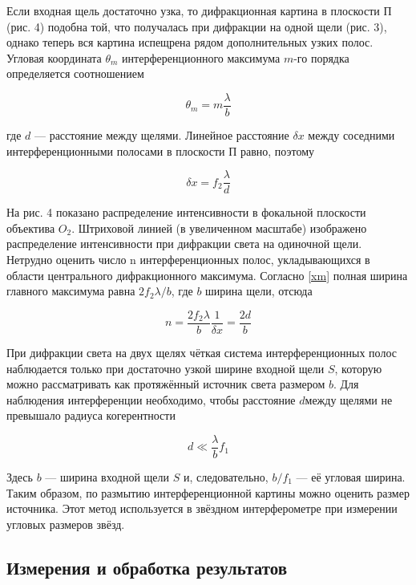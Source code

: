 \documentclass[15pt,a5paper,reqno]{article}
\begin{document}
Если входная щель достаточно узка, то дифракционная картина
в плоскости П (рис. 4) подобна той, что получалась при дифракции
на одной щели (рис. 3), однако теперь вся картина испещрена рядом
дополнительных узких полос.
Угловая координата $ \theta_m $ интерференционного максимума $ m $-го порядка определяется соотношением

\begin{equation}\label{}
\theta_m = m \dfrac{\lambda}{b}
\end{equation}

где $ d $ --- расстояние между щелями. Линейное расстояние $ \delta x $ между соседними интерференционными полосами в плоскости П равно, поэтому

\begin{equation}\label{dx}
\delta x = f_2 \dfrac{\lambda}{d}
\end{equation}

На рис. 4 показано распределение интенсивности в фокальной плоскости объектива $ O_2 $. Штриховой линией (в увеличенном масштабе)
изображено распределение интенсивности при дифракции света на одиночной щели. Нетрудно оценить число n интерференционных полос,
укладывающихся в области центрального дифракционного максимума.
Согласно \eqref{xm} полная ширина главного максимума равна $ 2 f_2 \lambda /b $, где $ b $ ширина щели, отсюда

\begin{equation}\label{n}
n = \dfrac{2f_2 \lambda}{b} \dfrac{1}{\delta x} = \dfrac{2d}{b}
\end{equation}

При дифракции света на двух щелях чёткая система интерференционных полос наблюдается только при достаточно узкой ширине входной щели $ S $, которую можно рассматривать как протяжённый источник света размером $ b $. Для наблюдения интерференции необходимо, чтобы расстояние $ d $между щелями не превышало радиуса когерентности

\begin{equation}\label{}
d \ll \dfrac{\lambda}{b} f_1
\end{equation}

Здесь $ b $ --- ширина входной щели $ S $ и, следовательно, $  b/f_1 $ --- её угловая ширина. Таким образом, по размытию интерференционной картины можно оценить размер источника. Этот метод используется в звёздном интерферометре при измерении угловых размеров звёзд.

\subsection{Измерения и обработка результатов}
\end{document}
